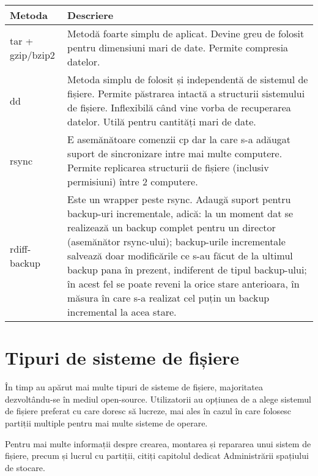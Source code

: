 \begin{table}[htb]
\begin{center}
	\begin{tabular}{ | p{} | p{} | }
	\hline
		\textbf{Metoda} & \textbf{Descriere} \\
	\hline
		tar + gzip/bzip2 & Metodă foarte simplu de aplicat. Devine greu
		de folosit pentru dimensiuni mari de date. Permite compresia
		datelor. \\
	\hline
		dd & Metoda simplu de folosit și independentă de sistemul de
		fișiere. Permite păstrarea intactă a structurii sistemului de
		fișiere. Inflexibilă când vine vorba de recuperarea datelor.
		Utilă pentru cantități mari de date. \\
	\hline
		rsync & E asemănătoare comenzii cp dar la care s-a adăugat
		suport de sincronizare intre mai multe computere. Permite
		replicarea structurii de fișiere (inclusiv permisiuni) între 2
		computere. \\
	\hline
		rdiff-backup & Este un wrapper peste rsync. Adaugă suport pentru
		backup-uri incrementale, adică: la un moment dat se realizează
		un backup complet pentru un director (asemănător rsync-ului);
		backup-urile incrementale salvează doar modificările ce s-au
		făcut de la ultimul backup pana în prezent, indiferent de tipul
		backup-ului; în acest fel se poate reveni la orice stare
		anterioara, în măsura în care s-a realizat cel puțin un backup
		incremental la acea stare. \\
	\hline
	\end{tabular}
	\label{table:file-system-backup-cmd}
\end{center}
\end{table}

\section{Tipuri de sisteme de fișiere}
\label{sec:file-system-fs-types}

În timp au apărut mai multe tipuri de sisteme de fișiere, majoritatea
dezvoltându-se în mediul open-source. Utilizatorii au opțiunea de a alege
sistemul de fișiere preferat cu care doresc să lucreze, mai ales în cazul în
care folosesc partiții multiple pentru mai multe sisteme de operare.

Pentru mai multe informații despre crearea, montarea și repararea unui sistem de
fișiere, precum și lucrul cu partiții, citiți capitolul dedicat Administrării
spațiului de stocare.

